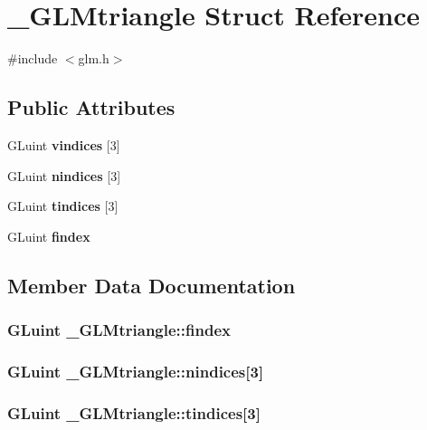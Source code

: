 \section{\-\_\-\-G\-L\-Mtriangle Struct Reference}
\label{struct___g_l_mtriangle}


{\ttfamily \#include $<$glm.\-h$>$}

\subsection*{Public Attributes}
\begin{DoxyCompactItemize}
\item 
G\-Luint {\bf vindices} [3]
\item 
G\-Luint {\bf nindices} [3]
\item 
G\-Luint {\bf tindices} [3]
\item 
G\-Luint {\bf findex}
\end{DoxyCompactItemize}


\subsection{Member Data Documentation}
\subsubsection[{findex}]{\setlength{\rightskip}{0pt plus 5cm}G\-Luint \-\_\-\-G\-L\-Mtriangle\-::findex}\label{struct___g_l_mtriangle_a5b153daf9e5ffee033dbd919c1a8c02a}
\subsubsection[{nindices}]{\setlength{\rightskip}{0pt plus 5cm}G\-Luint \-\_\-\-G\-L\-Mtriangle\-::nindices[3]}\label{struct___g_l_mtriangle_a435600028fff20ba36c044a187b78649}
\subsubsection[{tindices}]{\setlength{\rightskip}{0pt plus 5cm}G\-Luint \-\_\-\-G\-L\-Mtriangle\-::tindices[3]}\label{struct___g_l_mtriangle_a659836cad97a9458493f90117dc8edaa}
